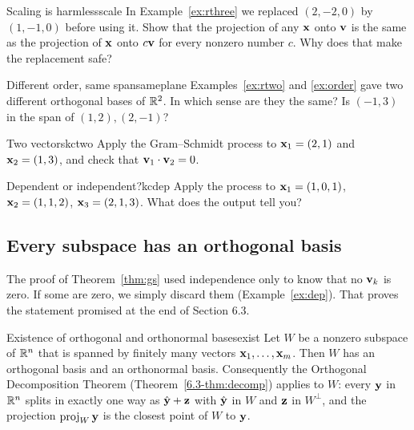 \documentclass[11pt]{article}
\begin{document}
\begin{think}{Scaling is harmless}{scale}
In Example~\ref{ex:rthree} we replaced $(2,-2,0)$ by $(1,-1,0)$ before using it. Show that the projection of any $\mathbf{x}$ onto $\mathbf{v}$ is the same as the projection of $\mathbf{x}$ onto $c\mathbf{v}$ for every nonzero number $c$. Why does that make the replacement safe?
\end{think}

\begin{think}{Different order, same span}{sameplane}
Examples~\ref{ex:rtwo} and \ref{ex:order} gave two different orthogonal bases of $\mathbb{R}^2$. In which sense are they the same? Is $(-1,3)$ in the span of $(1,2),(2,-1)$?
\end{think}

\begin{kc}{Two vectors}{kctwo}
Apply the Gram--Schmidt process to $\mathbf{x}_1=(2,1)$ and $\mathbf{x}_2=(1,3)$, and check that $\mathbf{v}_1\cdot\mathbf{v}_2=0$.
\end{kc}

\begin{kc}{Dependent or independent?}{kcdep}
Apply the process to $\mathbf{x}_1=(1,0,1)$, $\mathbf{x}_2=(1,1,2)$, $\mathbf{x}_3=(2,1,3)$. What does the output tell you?
\end{kc}

\subsection*{Every subspace has an orthogonal basis}

The proof of Theorem~\ref{thm:gs} used independence only to know that no $\mathbf{v}_k$ is zero. If some are zero, we simply discard them (Example~\ref{ex:dep}). That proves the statement promised at the end of Section 6.3.

\begin{thm}{Existence of orthogonal and orthonormal bases}{exist}
Let $W$ be a nonzero subspace of $\mathbb{R}^n$ that is spanned by finitely many vectors $\mathbf{x}_1,\dots,\mathbf{x}_m$. Then $W$ has an orthogonal basis and an orthonormal basis. Consequently the Orthogonal Decomposition Theorem (Theorem~\ref{6.3-thm:decomp}) applies to $W$: every $\mathbf{y}$ in $\mathbb{R}^n$ splits in exactly one way as $\hat{\mathbf{y}}+\mathbf{z}$ with $\hat{\mathbf{y}}$ in $W$ and $\mathbf{z}$ in $W^{\perp}$, and the projection $\operatorname{proj}_W\mathbf{y}$ is the closest point of $W$ to $\mathbf{y}$.
\end{thm}
\end{document}
